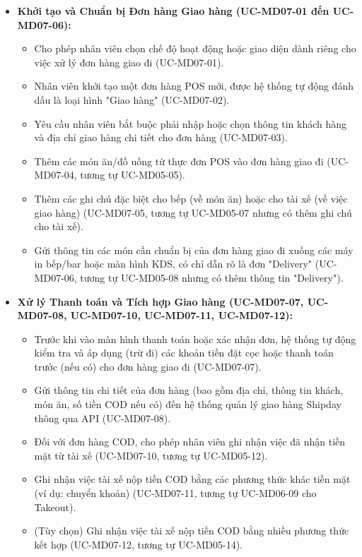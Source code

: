 \begin{itemize}
    \item \textbf{Khởi tạo và Chuẩn bị Đơn hàng Giao hàng (UC-MD07-01 đến UC-MD07-06):}
    \begin{itemize}
        \item Cho phép nhân viên chọn chế độ hoạt động hoặc giao diện dành riêng cho việc xử lý đơn hàng giao đi (UC-MD07-01).
        \item Nhân viên khởi tạo một đơn hàng POS mới, được hệ thống tự động đánh dấu là loại hình "Giao hàng" (UC-MD07-02).
        \item Yêu cầu nhân viên bắt buộc phải nhập hoặc chọn thông tin khách hàng và địa chỉ giao hàng chi tiết cho đơn hàng (UC-MD07-03).
        \item Thêm các món ăn/đồ uống từ thực đơn POS vào đơn hàng giao đi (UC-MD07-04, tương tự UC-MD05-05).
        \item Thêm các ghi chú đặc biệt cho bếp (về món ăn) hoặc cho tài xế (về việc giao hàng) (UC-MD07-05, tương tự UC-MD05-07 nhưng có thêm ghi chú cho tài xế).
        \item Gửi thông tin các món cần chuẩn bị của đơn hàng giao đi xuống các máy in bếp/bar hoặc màn hình KDS, có chỉ dẫn rõ là đơn "Delivery" (UC-MD07-06, tương tự UC-MD05-08 nhưng có thêm thông tin "Delivery").
    \end{itemize}

    \item \textbf{Xử lý Thanh toán và Tích hợp Giao hàng (UC-MD07-07, UC-MD07-08, UC-MD07-10, UC-MD07-11, UC-MD07-12):}
    \begin{itemize}
        \item Trước khi vào màn hình thanh toán hoặc xác nhận đơn, hệ thống tự động kiểm tra và áp dụng (trừ đi) các khoản tiền đặt cọc hoặc thanh toán trước (nếu có) cho đơn hàng giao đi (UC-MD07-07).
        \item Gửi thông tin chi tiết của đơn hàng (bao gồm địa chỉ, thông tin khách, món ăn, số tiền COD nếu có) đến hệ thống quản lý giao hàng Shipday thông qua API (UC-MD07-08).
        \item Đối với đơn hàng COD, cho phép nhân viên ghi nhận việc đã nhận tiền mặt từ tài xế (UC-MD07-10, tương tự UC-MD05-12).
        \item Ghi nhận việc tài xế nộp tiền COD bằng các phương thức khác tiền mặt (ví dụ: chuyển khoản) (UC-MD07-11, tương tự UC-MD06-09 cho Takeout).
        \item (Tùy chọn) Ghi nhận việc tài xế nộp tiền COD bằng nhiều phương thức kết hợp (UC-MD07-12, tương tự UC-MD05-14).
    \end{itemize}


\end{itemize}
